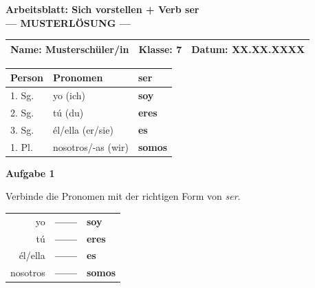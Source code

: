 \documentclass[11pt, a4paper]{article}
\newcommand{\fachfarbe}{spanisch}
\newcommand{\thema}{Sich vorstellen + Verb ser}
\newcommand{\klasse}{7}
\newcommand{\punktebox}[1]{\hfill\fbox{\small \_/#1}}
\newcommand{\loesung}[1]{\textcolor{loesung}{\textbf{#1}}}
\newenvironment{aufgabe}[1]{%
    \vspace{10pt}
    \noindent\textbf{\textcolor{\fachfarbe}{Aufgabe #1}}
    \vspace{5pt}
    \begin{list}{}{\leftmargin=0pt}
    \item[]
}{%
    \end{list}
}
\begin{document}
\begin{center}
    {\Large\bfseries\textcolor{\fachfarbe}{Arbeitsblatt: \thema}}\\[0.3em]
    {\large\textcolor{loesung}{\textbf{--- MUSTERLÖSUNG ---}}}
\end{center}

\vspace{5pt}

\noindent
\begin{tabularx}{\textwidth}{|X|X|X|}
\hline
\textbf{Name:} \textcolor{loesung}{Musterschüler/in} &
\textbf{Klasse:} \klasse &
\textbf{Datum:} \textcolor{loesung}{XX.XX.XXXX} \\
\hline
\end{tabularx}

\vspace{15pt}


\begin{merkkasten}

\begin{center}
\begin{tabular}{|l|l|l|}
\hline
\textbf{Person} & \textbf{Pronomen} & \textbf{ser} \\
\hline
1. Sg. & yo (ich) & \loesung{soy} \\
\hline
2. Sg. & tú (du) & \loesung{eres} \\
\hline
3. Sg. & él/ella (er/sie) & \loesung{es} \\
\hline
1. Pl. & nosotros/-as (wir) & \loesung{somos} \\
\hline
\end{tabular}
\end{center}

\end{merkkasten}

\vspace{10pt}


\begin{aufgabe}{1}
Verbinde die Pronomen mit der richtigen Form von \textit{ser}. \punktebox{4}
\end{aufgabe}

\begin{center}
\begin{tabular}{rcl}
yo & \loesung{------} & \loesung{soy} \\[0.8em]
tú & \loesung{------} & \loesung{eres} \\[0.8em]
él/ella & \loesung{------} & \loesung{es} \\[0.8em]
nosotros & \loesung{------} & \loesung{somos} \\
\end{tabular}
\end{center}
\end{document}
